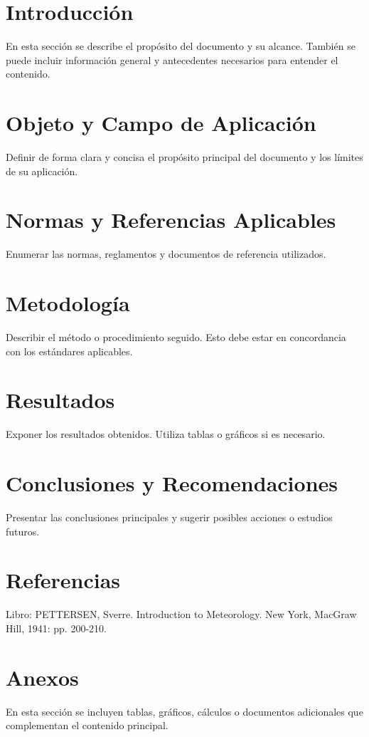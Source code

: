 \documentclass[a4paper,12pt]{article}
\begin{document}
\begin{Form}
\newpage

\section{Introducción}
En esta sección se describe el propósito del documento y su alcance. También se puede incluir información general y antecedentes necesarios para entender el contenido.

\section{Objeto y Campo de Aplicación}
Definir de forma clara y concisa el propósito principal del documento y los límites de su aplicación.

\section{Normas y Referencias Aplicables}
Enumerar las normas, reglamentos y documentos de referencia utilizados.


\section{Metodología}
Describir el método o procedimiento seguido. Esto debe estar en concordancia con los estándares aplicables.

\section{Resultados}
Exponer los resultados obtenidos. Utiliza tablas o gráficos si es necesario.

\section{Conclusiones y Recomendaciones}
Presentar las conclusiones principales y sugerir posibles acciones o estudios futuros.

\section{Referencias}
Libro: PETTERSEN, Sverre. Introduction to Meteorology. New York, MacGraw Hill, 1941: pp. 200-210.


\appendix
\section{Anexos}
En esta sección se incluyen tablas, gráficos, cálculos o documentos adicionales que complementan el contenido principal.


\end{Form}
\end{document}
